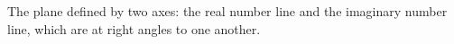 The plane defined by two axes: the real number line and the imaginary
number line, which are at right angles to one another.